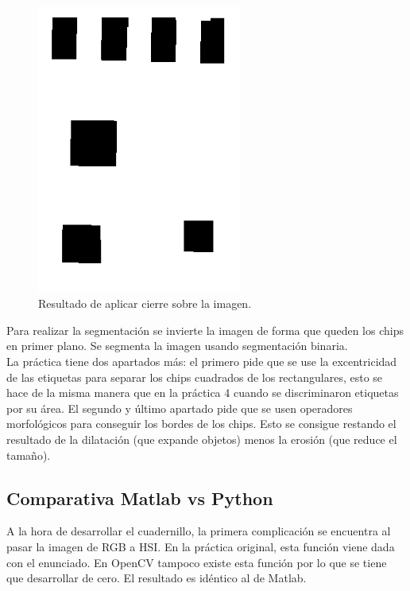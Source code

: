 \documentclass[a4paper,12pt]{report}
\begin{document}
\begin{figure}[h]
\centering
\includegraphics[width=0.6\textwidth]{imagenes/Closing}
\caption{Resultado de aplicar cierre sobre la imagen.}
\label{closing} 
\end{figure}

Para realizar la segmentación se invierte la imagen de forma que queden los chips en primer plano. Se segmenta la imagen usando segmentación binaria.\\

La práctica tiene dos apartados más: el primero pide que se use la excentricidad de las etiquetas para separar los chips cuadrados de los rectangulares, esto se hace de la misma manera que en la práctica 4 cuando se discriminaron etiquetas por su área. El segundo y último apartado pide que se usen operadores morfológicos para conseguir los bordes de los chips. Esto se consigue restando el resultado de la dilatación (que expande objetos) menos la erosión (que reduce el tamaño).\\

\subsection{Comparativa Matlab vs Python}

A la hora de desarrollar el cuadernillo, la primera complicación se encuentra al pasar la imagen de RGB a HSI. En la práctica original, esta función viene dada con el enunciado. En OpenCV tampoco existe esta función por lo que  se tiene que desarrollar de cero. El resultado es idéntico al de Matlab.\\
\end{document}
